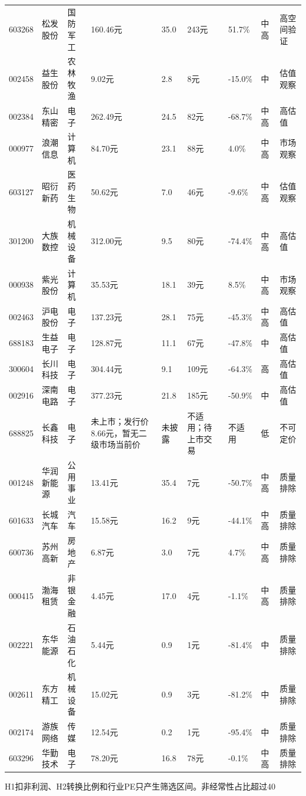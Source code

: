 \begin{longtable}{L{1.05cm}L{1.55cm}L{1.55cm}R{0.85cm}R{0.85cm}R{0.85cm}R{0.85cm}R{0.65cm}L{2.65cm}}
603268 & 松发股份 & 国防军工 & 160.46元 & 35.0 & 243元 & 51.7\% & 中高 & 高空间验证 \\
002458 & 益生股份 & 农林牧渔 & 9.02元 & 2.8 & 8元 & -15.0\% & 中 & 估值观察 \\
002384 & 东山精密 & 电子 & 262.49元 & 24.5 & 82元 & -68.7\% & 中高 & 高估值 \\
000977 & 浪潮信息 & 计算机 & 84.70元 & 23.1 & 88元 & 4.0\% & 中高 & 市场观察 \\
603127 & 昭衍新药 & 医药生物 & 50.62元 & 7.0 & 46元 & -9.6\% & 中高 & 估值观察 \\
301200 & 大族数控 & 机械设备 & 312.00元 & 9.5 & 80元 & -74.4\% & 中高 & 高估值 \\
000938 & 紫光股份 & 计算机 & 35.53元 & 18.1 & 39元 & 8.5\% & 中高 & 市场观察 \\
002463 & 沪电股份 & 电子 & 137.23元 & 28.1 & 75元 & -45.3\% & 中高 & 高估值 \\
688183 & 生益电子 & 电子 & 128.87元 & 11.1 & 67元 & -47.8\% & 中 & 高估值 \\
300604 & 长川科技 & 电子 & 304.44元 & 9.1 & 109元 & -64.3\% & 高 & 高估值 \\
002916 & 深南电路 & 电子 & 377.23元 & 21.8 & 185元 & -50.9\% & 中 & 高估值 \\
688825 & 长鑫科技 & 电子 & 未上市；发行价8.66元，暂无二级市场当前价 & 未披露 & 不适用；待上市交易 & 不适用 & 低 & 不可定价 \\
001248 & 华润新能源 & 公用事业 & 13.41元 & 35.4 & 7元 & -50.7\% & 中高 & 质量排除 \\
601633 & 长城汽车 & 汽车 & 15.58元 & 16.2 & 9元 & -44.1\% & 中高 & 质量排除 \\
600736 & 苏州高新 & 房地产 & 6.87元 & 3.0 & 7元 & 4.7\% & 中高 & 质量排除 \\
000415 & 渤海租赁 & 非银金融 & 4.45元 & 17.0 & 4元 & -1.1\% & 中高 & 质量排除 \\
002221 & 东华能源 & 石油石化 & 5.44元 & 0.9 & 1元 & -81.4\% & 中 & 质量排除 \\
002611 & 东方精工 & 机械设备 & 15.02元 & 0.9 & 3元 & -81.2\% & 中 & 质量排除 \\
002174 & 游族网络 & 传媒 & 12.54元 & 0.2 & 1元 & -95.4\% & 中 & 质量排除 \\
603296 & 华勤技术 & 电子 & 78.20元 & 16.8 & 78元 & -0.1\% & 中高 & 质量排除 \\
\bottomrule
\end{longtable}
\normalsize

\begin{riskbox}[候选层使用规则]
H1扣非利润、H2转换比例和行业PE只产生筛选区间。非经常性占比超过40%
\end{riskbox}
